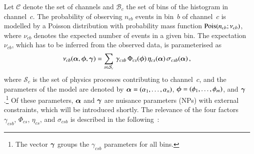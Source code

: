 Let $\mathcal{C}$ denote the set of channels and $\mathcal{B}_{c}$ the set of
bins of the histogram in channel~$c$. The probability of observing $n_{cb}$
events in bin~$b$ of channel~$c$ is modelled by a Poisson distribution with
probability mass function $\operatorname{Pois}(n_{cb}; \nu_{cb})$, where $\nu_{cb}$ denotes
the expected number of events in a given bin. The expectation~$\nu_{cb}$, which
has to be inferred from the observed data, is parameterised
as~\cite{cranmer2012}
\begin{align*}
  \nu_{cb}(\bm{\alpha}, \bm{\phi}, \bm{\gamma}) =
  \sum_{s \in \mathcal{S}_{c}} \, \gamma_{csb} \, \Phi_{cs}(\bm{\phi}) \, \eta_{cs}(\bm{\alpha}) \, \sigma_{csb}(\bm{\alpha}) \,\text{,}
\end{align*}
where $\mathcal{S}_{c}$ is the set of physics processes contributing to
channel~$c$, and the parameters of the model are denoted by
${\bm{\alpha} = (\alpha_1, \dots, \alpha_n)}$,
${\bm{\phi} = (\phi_1, \dots, \phi_m)}$, and $\bm{\gamma}$.\footnote{The
  vector $\bm{\gamma}$ groups the $\gamma_{csb}$ parameters for all bins.} Of
these parameters, $\bm{\alpha}$ and $\bm{\gamma}$ are nuisance parameters
(NPs) with external constraints, which will be introduced shortly.  The
relevance of the four factors $\gamma_{csb}$, $\Phi_{cs}$, $\eta_{cs}$, and
$\sigma_{csb}$ is described in the following~\cite{cranmer2012}:
